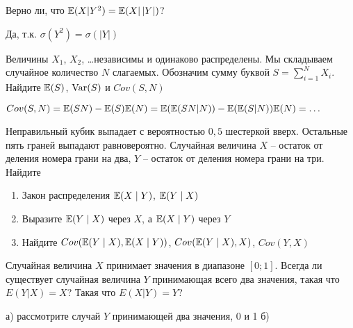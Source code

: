 \begin{problem}
Верно ли, что $\mathbb{E}(X|Y^{2})=\mathbb{E}(X|\,|Y|)$?
\end{problem} 
\begin{solution} 
Да, т.к. $\sigma(Y^{2})=\sigma(|Y|)$
\end{solution}

\begin{problem}
Величины $X_1$, $X_2$, \ldots независимы и одинаково распределены. Мы складываем случайное количество $N$ слагаемых. Обозначим сумму буквой $S=\sum_{i=1}^{N}X_i$. Найдите $\mathbb{E}(S)$, $\operatorname{Var}(S)$ и $Cov(S,N)$
\end{problem} 
\begin{solution} 
 $Cov(S,N)=\mathbb{E}(SN)-\mathbb{E}(S)\mathbb{E}(N)=\mathbb{E}(\mathbb{E}(SN|N))-\mathbb{E}(\mathbb{E}(S|N))\mathbb{E}(N)=\ldots$ 
\end{solution}

\begin{problem}
Неправильный кубик выпадает с вероятностью $0{,}5$ шестеркой вверх. Остальные пять граней выпадают равновероятно. Случайная величина $X$ -- остаток от деления номера грани на два, $Y$ -- остаток от деления номера грани на три. Найдите
\begin{enumerate}
\item Закон распределения $\mathbb{E}(X\mid Y)$, $\mathbb{E}(Y\mid X)$
\item Выразите $\mathbb{E}(Y\mid X)$ через $X$, а $\mathbb{E}(X\mid Y)$ через $Y$
\item Найдите $Cov(\mathbb{E}(Y\mid X),\mathbb{E}(X\mid Y))$, $Cov(\mathbb{E}(Y\mid X),X)$, $Cov(Y,X)$
\end{enumerate}
\end{problem} 
\begin{solution} 

\end{solution}

\begin{problem}
Случайная величина $X$ принимает значения в диапазоне $[0;1]$. Всегда ли существует случайная величина $Y$ принимающая всего два значения, такая что $E(Y|X)=X$? Такая что $E(X|Y)=Y$? 
\end{problem} 
\begin{solution} 
а) рассмотрите случай $Y$ принимающей два значения, 0 и 1 б)
\end{solution}

